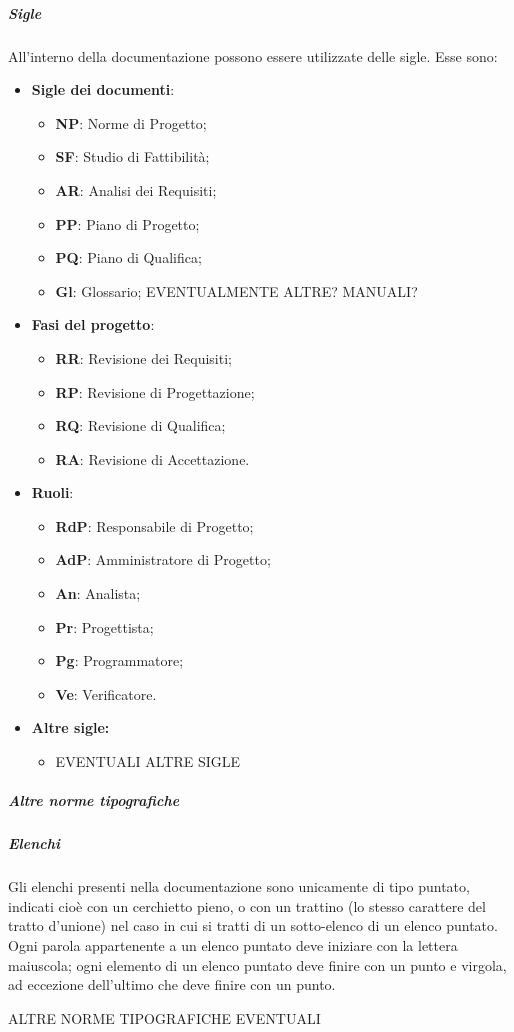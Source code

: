 \documentclass[../norme-di-progetto.tex]{subfiles}
\begin{document}
\subparagraph{Sigle}
All'interno della documentazione possono essere utilizzate delle sigle. Esse sono:
\begin{itemize}
  \item \textbf{Sigle dei documenti}:
  \begin{itemize}
    \item \textbf{NP}: Norme di Progetto;
    \item \textbf{SF}: Studio di Fattibilità;
    \item \textbf{AR}: Analisi dei Requisiti;
    \item \textbf{PP}: Piano di Progetto;
    \item \textbf{PQ}: Piano di Qualifica;
    \item \textbf{Gl}: Glossario;
    EVENTUALMENTE ALTRE? MANUALI?
  \end{itemize}
  \item \textbf{Fasi del progetto}:
  \begin{itemize}
  \item \textbf{RR}: Revisione dei Requisiti;
  \item \textbf{RP}: Revisione di Progettazione;
  \item \textbf{RQ}: Revisione di Qualifica;
  \item \textbf{RA}: Revisione di Accettazione.
  \end{itemize}
  \item \textbf{Ruoli}:
  \begin{itemize}
  \item \textbf{RdP}: Responsabile di Progetto;
  \item \textbf{AdP}: Amministratore di Progetto;
  \item \textbf{An}: Analista;
  \item \textbf{Pr}: Progettista;
  \item \textbf{Pg}: Programmatore;
  \item \textbf{Ve}: Verificatore.
  \end{itemize}
  \item \textbf{Altre sigle:}
  \begin{itemize}
    \item EVENTUALI ALTRE SIGLE
  \end{itemize}
\end{itemize}

\subparagraph{Altre norme tipografiche}
\subparagraph*{Elenchi}
Gli elenchi presenti nella documentazione sono unicamente di tipo puntato, indicati cioè con un cerchietto pieno, o con un trattino (lo stesso carattere del tratto d'unione) nel caso in cui si tratti di un sotto-elenco di un elenco puntato. \\
Ogni parola appartenente a un elenco puntato deve iniziare con la lettera maiuscola; ogni elemento di un elenco puntato deve finire con un punto e virgola, ad eccezione dell'ultimo che deve finire con un punto.

ALTRE NORME TIPOGRAFICHE EVENTUALI
\end{document}
